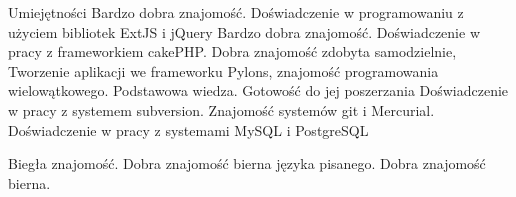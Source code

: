 \begin{rubric}{Umiejętności}
\entry*[JavaScript]
	Bardzo dobra znajomość. Doświadczenie w programowaniu z użyciem
	bibliotek ExtJS i jQuery
\entry*[PHP]
	Bardzo dobra znajomość. Doświadczenie w pracy z frameworkiem cakePHP.
\entry*[Python]
	Dobra znajomość zdobyta samodzielnie, Tworzenie aplikacji we frameworku
	Pylons, znajomość programowania wielowątkowego.
\entry*[Java, C, C++]
	Podstawowa wiedza. Gotowość do jej poszerzania
	Doświadczenie w pracy z systemem subversion. Znajomość systemów git i
	Mercurial.
	Doświadczenie w pracy z systemami MySQL i PostgreSQL

\entry*[Angielski]
	Biegła znajomość.
\entry*[Rosyjski]
	Dobra znajomość bierna języka pisanego.
\entry*[Cerkiewnosłowiański]
	Dobra znajomość bierna.
\end{rubric}
